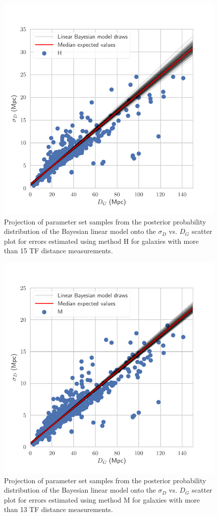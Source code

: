 \documentclass[a4paper,fleqn,usenatbib]{mnras}
\begin{document}
\begin{figure}
	\includegraphics[scale=0.7]{drawsl}
    \caption{Projection of parameter set samples from the posterior probability distribution of the Bayesian linear model onto the $\sigma_D$ vs. $D_G$ scatter plot for errors estimated using method H for galaxies with more than 15 TF distance measurements.}
    \label{fig:drawsl}
\end{figure}
\begin{figure}
	\includegraphics[scale=0.7]{drawsl2}
    \caption{Projection of parameter set samples from the posterior probability distribution of the Bayesian linear model onto the $\sigma_D$ vs. $D_G$ scatter plot for errors estimated using method M for galaxies with more than 13 TF distance measurements.}
    \label{fig:drawsl2}
\end{figure}
\end{document}
